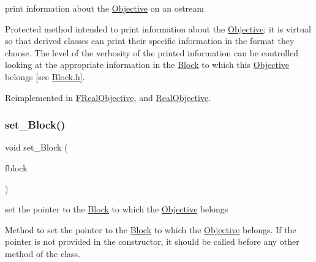 print information about the \mbox{\hyperlink{class_s_m_spp__di__unipi__it_1_1_objective}{Objective}} on an ostream 

Protected method intended to print information about the \mbox{\hyperlink{class_s_m_spp__di__unipi__it_1_1_objective}{Objective}}; it is virtual so that derived classes can print their specific information in the format they choose. The level of the verbosity of the printed information can be controlled looking at the appropriate information in the \mbox{\hyperlink{class_s_m_spp__di__unipi__it_1_1_block}{Block}} to which this \mbox{\hyperlink{class_s_m_spp__di__unipi__it_1_1_objective}{Objective}} belongs \mbox{[}see \mbox{\hyperlink{_block_8h}{Block.\+h}}\mbox{]}. 

Reimplemented in \mbox{\hyperlink{class_s_m_spp__di__unipi__it_1_1_f_real_objective_a59a9fcbf8f9f86d348344b2073644b0e}{F\+Real\+Objective}}, and \mbox{\hyperlink{class_s_m_spp__di__unipi__it_1_1_real_objective_a59a9fcbf8f9f86d348344b2073644b0e}{Real\+Objective}}.

\mbox{\label{class_s_m_spp__di__unipi__it_1_1_objective_ae25adfb4d0355dc999de19a850b0025d}} 
\subsubsection{\texorpdfstring{set\+\_\+\+Block()}{set\_Block()}}
{\footnotesize\ttfamily void set\+\_\+\+Block (\begin{DoxyParamCaption}\item[{\mbox{\hyperlink{class_s_m_spp__di__unipi__it_1_1_block}{Block}} $\ast$}]{fblock }\end{DoxyParamCaption})\hspace{0.3cm}{\ttfamily [inline]}}



set the pointer to the \mbox{\hyperlink{class_s_m_spp__di__unipi__it_1_1_block}{Block}} to which the \mbox{\hyperlink{class_s_m_spp__di__unipi__it_1_1_objective}{Objective}} belongs 

Method to set the pointer to the \mbox{\hyperlink{class_s_m_spp__di__unipi__it_1_1_block}{Block}} to which the \mbox{\hyperlink{class_s_m_spp__di__unipi__it_1_1_objective}{Objective}} belongs. If the pointer is not provided in the constructor, it should be called before any other method of the class. \mbox{\label{class_s_m_spp__di__unipi__it_1_1_objective_ac8a312b13d860de392750856449ef2a8}} 
